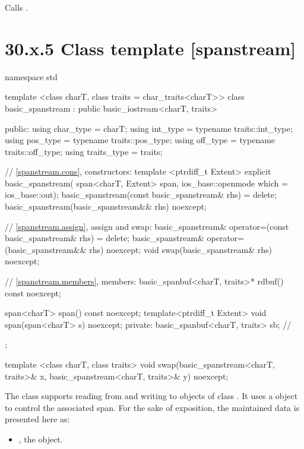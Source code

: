 \documentclass[ebook,11pt,article]{memoir}
\begin{document}
\begin{itemdescr}
\pnum
\effects
Calls
.
\end{itemdescr}

\section{30.x.5 Class template  [spanstream] }

\begin{codeblock}
namespace std {
  template <class charT, class traits = char_traits<charT>>
  class basic_spanstream
    : public basic_iostream<charT, traits> {
  public:
    using char_type      = charT;
    using int_type       = typename traits::int_type;
    using pos_type       = typename traits::pos_type;
    using off_type       = typename traits::off_type;
    using traits_type    = traits;

    // \ref{spanstream.cons}, constructors:
    template <ptrdiff_t Extent>
    explicit basic_spanstream(
      span<charT, Extent> span,
      ios_base::openmode which = ios_base::out);
    basic_spanstream(const basic_spanstream& rhs) = delete;
    basic_spanstream(basic_spanstream&& rhs) noexcept;

    // \ref{spanstream.assign}, assign and swap:
    basic_spanstream& operator=(const basic_spanstream& rhs) = delete;
    basic_spanstream& operator=(basic_spanstream&& rhs) noexcept;
    void swap(basic_spanstream& rhs) noexcept;

    // \ref{spanstream.members}, members:
    basic_spanbuf<charT, traits>* rdbuf() const noexcept;

    span<charT> span() const noexcept;
	template<ptrdiff_t Extent>
    void span(span<charT> s) noexcept;
  private:
    basic_spanbuf<charT, traits> sb; // \expos
  };

  template <class charT, class traits>
    void swap(basic_spanstream<charT, traits>& x,
              basic_spanstream<charT, traits>& y) noexcept;
}
\end{codeblock}

\pnum
The class
supports reading from and writing to objects of class
.
It uses a
object to control the associated span.
For the sake of exposition, the maintained data is presented here as:
\begin{itemize}
\item
{}, the  object.
\end{itemize}
\end{document}
